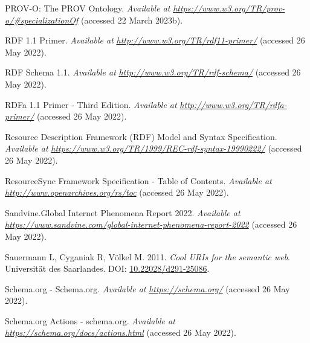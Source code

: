 \begin{CSLReferences}{1}{0}
\leavevmode{}%
PROV-O: The PROV Ontology. \emph{Available at} \href{https://www.w3.org/TR/prov-o/\#specializationOf}{\emph{https://www.w3.org/TR/prov-o/\#specializationOf}} (accessed 22 March 2023b).

\leavevmode{}%
RDF 1.1 Primer. \emph{Available at} \href{http://www.w3.org/TR/rdf11-primer/}{\emph{http://www.w3.org/TR/rdf11-primer/}} (accessed 26 May 2022).

\leavevmode{}%
RDF Schema 1.1. \emph{Available at} \href{http://www.w3.org/TR/rdf-schema/}{\emph{http://www.w3.org/TR/rdf-schema/}} (accessed 26 May 2022).

\leavevmode{}%
RDFa 1.1 Primer - Third Edition. \emph{Available at} \href{http://www.w3.org/TR/rdfa-primer/}{\emph{http://www.w3.org/TR/rdfa-primer/}} (accessed 26 May 2022).

\leavevmode{}%
Resource Description Framework (RDF) Model and Syntax Specification. \emph{Available at} \href{https://www.w3.org/TR/1999/REC-rdf-syntax-19990222/}{\emph{https://www.w3.org/TR/1999/REC-rdf-syntax-19990222/}} (accessed 26 May 2022).

\leavevmode{}%
ResourceSync Framework Specification - Table of Contents. \emph{Available at} \href{http://www.openarchives.org/rs/toc}{\emph{http://www.openarchives.org/rs/toc}} (accessed 26 May 2022).

\leavevmode{}%
Sandvine.Global Internet Phenomena Report 2022. \emph{Available at} \href{https://www.sandvine.com/global-internet-phenomena-report-2022}{\emph{https://www.sandvine.com/global-internet-phenomena-report-2022}} (accessed 26 May 2022).

\leavevmode{}%
Sauermann L, Cyganiak R, Völkel M. 2011. \emph{Cool URIs for the semantic web}. Universität des Saarlandes. DOI: \href{https://doi.org/10.22028/d291-25086}{10.22028/d291-25086}.

\leavevmode{}%
Schema.org - Schema.org. \emph{Available at} \href{https://schema.org/}{\emph{https://schema.org/}} (accessed 26 May 2022).

\leavevmode{}%
Schema.org Actions - schema.org. \emph{Available at} \href{https://schema.org/docs/actions.html}{\emph{https://schema.org/docs/actions.html}} (accessed 26 May 2022).


\end{CSLReferences}
